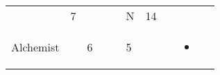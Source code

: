 \documentclass[12pt]{article}
\begin{document}
\begin{longtable}[]{@{}llllllllll@{}}
\begin{minipage}[t]{0.06\columnwidth}
\strut\end{minipage} &
\begin{minipage}[t]{0.06\columnwidth}\raggedright\strut
7
\strut\end{minipage} &
\begin{minipage}[t]{0.06\columnwidth}\raggedright\strut
\strut\end{minipage} &
\begin{minipage}[t]{0.06\columnwidth}\raggedright\strut
\strut\end{minipage} &
\begin{minipage}[t]{0.06\columnwidth}\raggedright\strut
\strut\end{minipage} &
\begin{minipage}[t]{0.07\columnwidth}\raggedright\strut
N
\strut\end{minipage} &
\begin{minipage}[t]{0.08\columnwidth}\raggedright\strut
14
\strut\end{minipage}\tabularnewline
\begin{minipage}[t]{0.13\columnwidth}\raggedright\strut
Alchemist
\strut\end{minipage} &
\begin{minipage}[t]{0.06\columnwidth}\raggedright\strut
\strut\end{minipage} &
\begin{minipage}[t]{0.06\columnwidth}\raggedright\strut
6
\strut\end{minipage} &
\begin{minipage}[t]{0.06\columnwidth}\raggedright\strut
\strut\end{minipage} &
\begin{minipage}[t]{0.06\columnwidth}\raggedright\strut
\strut\end{minipage} &
\begin{minipage}[t]{0.06\columnwidth}\raggedright\strut
5
\strut\end{minipage} &
\begin{minipage}[t]{0.06\columnwidth}\raggedright\strut
\strut\end{minipage} &
\begin{minipage}[t]{0.06\columnwidth}\raggedright\strut
\strut\end{minipage} &
\begin{minipage}[t]{0.07\columnwidth}\raggedright\strut
\begin{itemize}
\item
\end{itemize}
\strut\end{minipage} &

\end{longtable}
\end{document}
